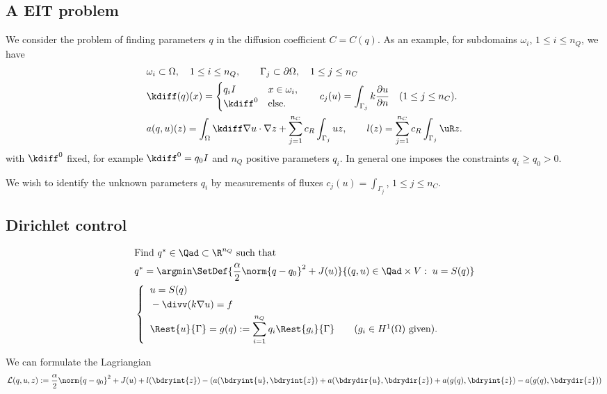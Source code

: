 %
\subsection{A EIT problem}\label{subsec:}
%
We consider the problem of finding parameters $q$ in the diffusion coefficient $C=C(q)$. As an example, for 
subdomains $\omega_i$, $1\le i\le n_Q$, we have
%
\begin{align*}
&\omega_i\subset \Omega,\quad 1\le i\le n_Q,\qquad \Gamma_j \subset \partial\Omega,\quad 1\le j \le n_C\\
&\kdiff(q)(x) = \begin{cases}
q_i I & x\in\omega_i,\\
\kdiff^0 & \mbox{else}.
\end{cases}
\qquad c_j(u) = \int_{\Gamma_j} k\frac{\partial u}{\partial n}\quad (1\le j\le n_C).\\
&a(q,u)(z) = \int_{\Omega} \kdiff\nabla u\cdot\nabla z + \sum_{j=1}^{n_C}c_R\int_{\Gamma_j}uz,\qquad 
l(z) = \sum_{j=1}^{n_C}c_R\int_{\Gamma_j}\uR z.
\end{align*}
%
with $\kdiff^0$ fixed, for example $\kdiff^0=q_0 I$ and $n_Q$ positive parameters $q_i$. 
In general one imposes the constraints $q_i\ge q_0>0$.

We wish to identify the unknown parameters $q_i$ by measurements of fluxes $c_j(u) = \int_{\Gamma_j}$, $1\le j\le n_C$.

%
\subsection{Dirichlet control}\label{subsec:}
%
%
%
\begin{align*}
&\mbox{Find $q^*\in \Qad\subset \R^{n_Q}$ such that}\\
&q^* = \argmin\SetDef{\frac{\alpha}{2}\norm{q-q_0}^2 +J(u)}{  (q,u)\in \Qad\times V:\; u = S(q)}\\
%
&\left\{\;
\begin{aligned}
&\;u = S(q)\\ 
&\;-\divv(k\nabla u) = f\\
&\;\Rest{u}{\Gamma} = g(q):= \sum_{i=1}^{n_Q} q_i \Rest{g_i}{\Gamma}\qquad \mbox{($g_i\in H^1(\Omega)$ given)}.
\end{aligned}
\right.
%
\end{align*}

We can formulate the Lagriangian
%
\begin{equation}\label{eq:NewNitscheDirichlet}
\mathcal L(q,u,z) := \frac{\alpha}{2}\norm{q-q_0}^2 +J(u) +l(\bdryint{z}) - \left(a(\bdryint{u},\bdryint{z}) + a(\bdrydir{u},\bdrydir{z}) + a(g(q),\bdryint{z}) - a(g(q),\bdrydir{z}) \right)
\end{equation}
%



%
\printbibliography[title=References Section~\thesection]
